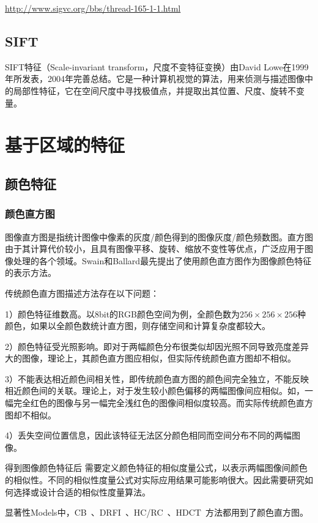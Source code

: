 \documentclass[12pt]{article}
\begin{document}
\url{http://www.sigvc.org/bbs/thread-165-1-1.html}

\subsection{SIFT}

SIFT特征（Scale-invariant transform，尺度不变特征变换）由David Lowe在1999年所发表，2004年完善总结。它是一种计算机视觉的算法，用来侦测与描述图像中的局部性特征，它在空间尺度中寻找极值点，并提取出其位置、尺度、旋转不变量。

\section{基于区域的特征}

\subsection{颜色特征}

\subsubsection{颜色直方图}

图像直方图是指统计图像中像素的灰度/颜色得到的图像灰度/颜色频数图。直方图由于其计算代价较小，且具有图像平移、旋转、缩放不变性等优点，广泛应用于图像处理的各个领域。Swain和Ballard最先提出了使用颜色直方图作为图像颜色特征的表示方法。

传统颜色直方图描述方法存在以下问题：

1）颜色特征维数高。以8bit的RGB颜色空间为例，全颜色数为$256 \times 256 \times 256$种颜色，如果以全颜色数统计直方图，则存储空间和计算复杂度都较大。

2）颜色特征受光照影响。即对于两幅颜色分布很类似却因光照不同导致亮度差异大的图像，理论上，其颜色直方图应相似，但实际传统颜色直方图却不相似。

3）不能表达相近颜色间相关性，即传统颜色直方图的颜色间完全独立，不能反映相近颜色间的关联。理论上，对于发生较小颜色偏移的两幅图像间应相似。如，一幅完全红色的图像与另一幅完全浅红色的图像间相似度较高。而实际传统颜色直方图却不相似。

4）丢失空间位置信息，因此该特征无法区分颜色相同而空间分布不同的两幅图像。

得到图像颜色特征后 需要定义颜色特征的相似度量公式，以表示两幅图像间颜色的相似性。不同的相似性度量公式对实际应用结果可能影响很大。因此需要研究如何选择或设计合适的相似性度量算法。

显著性Models中，CB~\cite{jiang2011automatic}、DRFI~\cite{jiang2013salient}、HC/RC~\cite{cheng2011global}、HDCT~\cite{kim2014salient}方法都用到了颜色直方图。
\end{document}
